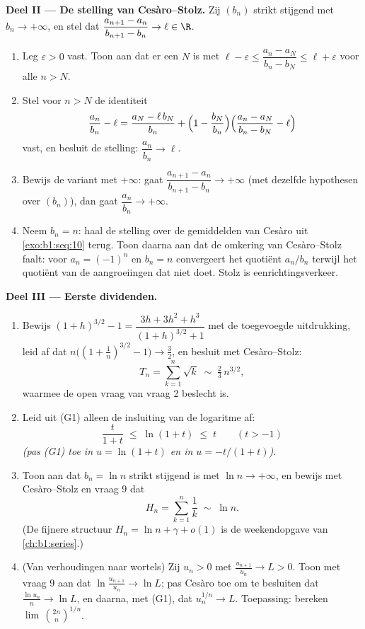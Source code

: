 \begin{problem}[{Weekendopgave --- de stelling van Cesàro--Stolz en de
asymptotiek $u_n \sim \sqrt{3/n}$ voor $u_{n+1} = \sin u_n$}]
\medskip
\noindent\textbf{Deel II --- De stelling van Cesàro--Stolz.} Zij $(b_n)$
strikt stijgend met $b_n \to +\infty$, en stel dat $\dfrac{a_{n+1} -
a_n}{b_{n+1} - b_n} \to \ell \in \R$.
\begin{enumerate}[resume]
  \item Leg $\varepsilon > 0$ vast. Toon aan dat er een $N$ is met $\ell
        - \varepsilon \leq \dfrac{a_n - a_N}{b_n - b_N} \leq \ell +
        \varepsilon$ voor alle $n > N$.
  \item Stel voor $n > N$ de identiteit
        \[
        \frac{a_n}{b_n} - \ell
        = \frac{a_N - \ell\,b_N}{b_n}
        + \Bigl(1 - \frac{b_N}{b_n}\Bigr)
        \Bigl(\frac{a_n - a_N}{b_n - b_N} - \ell\Bigr)
        \]
        vast, en besluit de stelling: $\dfrac{a_n}{b_n} \to \ell$.
  \item Bewijs de variant met $+\infty$: gaat $\dfrac{a_{n+1} -
        a_n}{b_{n+1} - b_n} \to +\infty$ (met dezelfde hypothesen over
        $(b_n)$), dan gaat $\dfrac{a_n}{b_n} \to +\infty$.
  \item Neem $b_n = n$: haal de stelling over de gemiddelden van Cesàro
        uit \cref{exo:b1:seq:10} terug. Toon daarna aan dat de omkering
        van Cesàro--Stolz faalt: voor $a_n = (-1)^n$ en $b_n = n$
        convergeert het quotiënt $a_n/b_n$ terwijl het quotiënt van de
        aangroeiingen dat niet doet. Stolz is eenrichtingsverkeer.
\end{enumerate}

\medskip
\noindent\textbf{Deel III --- Eerste dividenden.}
\begin{enumerate}[resume]
  \item Bewijs $(1+h)^{3/2} - 1 = \dfrac{3h + 3h^2 + h^3}{(1+h)^{3/2} +
        1}$ met de toegevoegde uitdrukking, leid af dat $n\bigl((1 +
        \tfrac1n)^{3/2} - 1\bigr) \to \tfrac32$, en besluit met
        Cesàro--Stolz:
        \[
        T_n = \sum_{k=1}^{n} \sqrt k \;\sim\; \tfrac23\,
        n^{3/2} ,
        \]
        waarmee de open vraag van vraag 2 beslecht is.
  \item Leid uit (G1) alleen de insluiting van de logaritme af:
        \[
        \frac{t}{1 + t} \;\leq\; \ln(1 + t) \;\leq\; t
        \qquad (t > -1)
        \]
        \emph{(pas (G1) toe in $u = \ln(1+t)$ en in $u = -t/(1+t)$)}.
  \item Toon aan dat $b_n = \ln n$ strikt stijgend is met $\ln n \to
        +\infty$, en bewijs met Cesàro--Stolz en vraag 9 dat
        \[
        H_n = \sum_{k=1}^{n} \frac 1k \;\sim\; \ln n .
        \]
        (De fijnere structuur $H_n = \ln n + \gamma + o(1)$ is de
        weekendopgave van \cref{ch:b1:series}.)
  \item (Van verhoudingen naar wortels) Zij $u_n > 0$ met
        $\frac{u_{n+1}}{u_n} \to L > 0$. Toon met vraag 9 aan dat
        $\ln\frac{u_{n+1}}{u_n} \to \ln L$; pas Cesàro toe om te
        besluiten dat $\frac{\ln u_n}{n} \to \ln L$, en daarna, met
        (G1), dat $u_n^{1/n} \to L$. Toepassing: bereken
        $\lim\,\binom{2n}{n}^{1/n}$.
\end{enumerate}


\end{problem}
